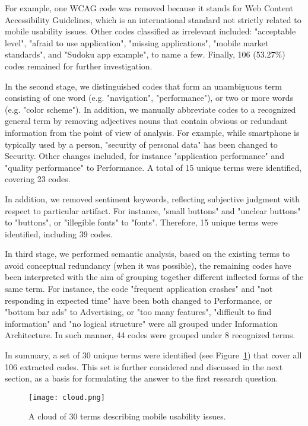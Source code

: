 \documentclass[preprint,12pt,number]{elsarticle}
\begin{document}
For example, one WCAG code was removed because it stands for Web Content Accessibility Guidelines, which is an international standard not strictly related to mobile usability issues. Other codes classified as irrelevant included: "acceptable level", "afraid to use application", "missing applications", "mobile market standards", and "Sudoku app example", to name a few.
Finally, 106 (53.27\%) codes remained for further investigation.

In the second stage, we distinguished codes that form an unambiguous term consisting of one word (e.g. "navigation", "performance"), or two or more words (e.g. "color scheme"). In addition, we manually abbreviate codes to a recognized general term by removing adjectives nouns that contain obvious or redundant information from the point of view of analysis. For example, while smartphone is typically used by a person, "security of personal data" has been changed to Security. Other changes included, for instance "application performance" and "quality performance" to Performance. A total of 15 unique terms were identified, covering 23 codes.

In addition, we removed sentiment keywords, reflecting subjective judgment with respect to particular artifact. For instance, "small buttons" and "unclear buttons" to "buttons", or "illegible fonts" to "fonts". Therefore, 15 unique terms were identified, including 39 codes. 

In third stage, we performed semantic analysis, based on the existing terms to avoid conceptual redundancy (when it was possible), the remaining codes have been interpreted with the aim of grouping together different inflected forms of the same term. For instance, the code "frequent application crashes" and "not responding in expected time" have been both changed to Performance, or "bottom bar ads" to Advertising, or "too many features", "difficult to find information" and "no logical structure" were all grouped under Information Architecture. In such manner, 44 codes were grouped under 8 recognized terms.

In summary, a set of 30 unique terms were identified (see Figure~\ref{fig:RQ1-terms}) that cover all 106 extracted codes. This set is further considered and discussed in the next section, as a basis for formulating the answer to the first research question.

\begin{figure}[ht]
    \centering
    \texttt{[image: cloud.png]}
    \caption{A cloud of 30 terms describing mobile usability issues.}
    \label{fig:RQ1-terms}
\end{figure}
\end{document}
